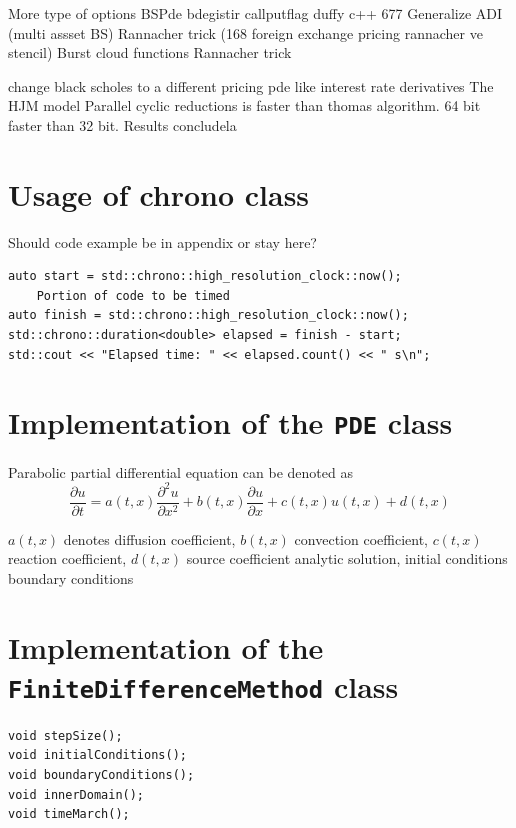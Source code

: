 \documentclass[12pt, oneside]{book}
\theoremstyle{plain}
\theoremstyle{definition}
\begin{document}
More type of options BSPde bdegistir callputflag duffy c++ 677 
Generalize ADI (multi assset BS)
Rannacher trick (168 foreign exchange pricing rannacher ve stencil)
Burst cloud functions
Rannacher trick

change black scholes to a different pricing pde like interest rate derivatives The HJM model \cite{kohl}
Parallel cyclic reductions is faster than thomas algorithm. 64 bit faster than 32 bit. 
Results concludela

\appendix
\chapter{Usage of chrono class}
Should code example be in appendix or stay here?
\begin{verbatim}
auto start = std::chrono::high_resolution_clock::now();
    Portion of code to be timed
auto finish = std::chrono::high_resolution_clock::now();
std::chrono::duration<double> elapsed = finish - start;
std::cout << "Elapsed time: " << elapsed.count() << " s\n";
\end{verbatim}

\chapter{Implementation of the {\tt PDE} class}
Parabolic partial differential equation can be denoted as
$$ \frac{\partial u}{\partial t} = a(t,x) \frac{\partial^2 u}{\partial x^2} + b(t,x) \frac{\partial u}{\partial x} + c(t,x) u(t,x) + d(t,x) $$

$a(t,x)$ denotes diffusion coefficient,  $b(t,x)$ convection coefficient, $c(t,x)$ reaction coefficient, $d(t,x)$ source coefficient
analytic solution, initial conditions boundary conditions
\chapter{Implementation of the {\tt FiniteDifferenceMethod} class}

\begin{verbatim}
void stepSize();
void initialConditions();
void boundaryConditions();
void innerDomain();
void timeMarch();
\end{verbatim}





\end{document}
